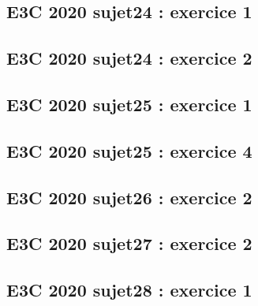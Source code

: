 \documentclass[lang=fr,edition=teacher,layout=sheet]{mxbook}
\begin{document}
\par\bigskip
{}\subsection*{E3C 2020 sujet24 : exercice 1}
\begingroup\endgroup
\par\bigskip
{}\subsection*{E3C 2020 sujet24 : exercice 2}
\begingroup\endgroup
\par\bigskip
{}\subsection*{E3C 2020 sujet25 : exercice 1}
\begingroup\endgroup
\par\bigskip
{}\subsection*{E3C 2020 sujet25 : exercice 4}
\begingroup\endgroup
\par\bigskip
{}\subsection*{E3C 2020 sujet26 : exercice 2}
\begingroup\endgroup
\par\bigskip
{}\subsection*{E3C 2020 sujet27 : exercice 2}
\begingroup\endgroup
\par\bigskip
{}\subsection*{E3C 2020 sujet28 : exercice 1}
\begingroup\endgroup
\par\bigskip
\end{document}

